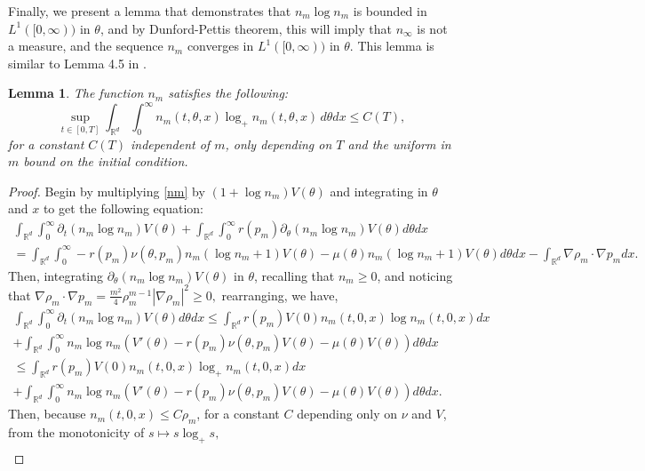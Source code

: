 \documentclass{amsart}
\newtheorem{lemma}[theorem]{Lemma}
\def\R{\mathbb R}
\begin{document}
Finally, we present a lemma that demonstrates that $n_m \log n_m$ is bounded in $L^1([0,\infty))$ in $\theta$, and by Dunford-Pettis theorem, this will imply that $n_\infty$ is not a measure, and the sequence $n_m$ converges in $L^1([0,\infty))$ in $\theta$. This lemma is similar to Lemma 4.5 in \cite{llmw}.
\begin{lemma}\label{lem.nlogn}
    The function $n_m$ satisfies the following:
    \begin{equation}\label{nlogn}
        \sup_{t \in [0,T]}\int_{\R^d}\int_{0}^{\infty}n_m(t,\theta,x)\log_{+}n_m(t,\theta,x)\,d\theta dx \leq C(T),
    \end{equation}
    for a constant $C(T)$ independent of $m$, only depending on $T$ and the uniform in $m$ bound on the initial condition.
\end{lemma}
\begin{proof}
    Begin by multiplying \eqref{nm} by $(1+\log n_m)V(\theta)$ and integrating in $\theta$ and $x$ to get the following equation:
    \begin{multline*}
    \int_{\R^d}\int_{0}^{\infty}\partial_t (n_m \log n_m)V(\theta)+\int_{\R^d}\int_{0}^{\infty}r(p_m)\partial_\theta(n_m \log n_m)V(\theta)d\theta dx\\=
    \int_{\R^d}\int_{0}^{\infty}-r(p_m)\nu(\theta,p_m)n_m(\log n_m+1)V(\theta)-\mu(\theta)n_m(\log n_m+1)V(\theta)d\theta dx -\int_{\R^d}\nabla \rho_m \cdot \nabla p_m dx.
    \end{multline*}
    Then, integrating $\partial_\theta (n_m \log n_m)V(\theta)$ in $\theta$, recalling that $n_m \geq 0$, and noticing that $\nabla \rho_m \cdot \nabla p_m =\frac{m^2}{4}\rho_m^{m-1}|\nabla \rho_m|^2 \geq 0,$ rearranging, we have,
    \begin{multline*}
        \int_{\R^d}\int_{0}^{\infty}\partial_t (n_m \log n_m)V(\theta)d\theta dx \leq \int_{\R^d}r(p_m)V(0)n_m(t,0,x)\log n_m (t,0,x)dx\\+\int_{\R^d}\int_{0}^{\infty}n_m \log n_m (V'(\theta)-r(p_m)\nu(\theta,p_m)V(\theta)-\mu(\theta)V(\theta))d\theta dx \\
         \leq \int_{\R^d}r(p_m)V(0)n_m(t,0,x)\log_+ n_m (t,0,x)dx\\+\int_{\R^d}\int_{0}^{\infty}n_m \log n_m (V'(\theta)-r(p_m)\nu(\theta,p_m)V(\theta)-\mu(\theta)V(\theta))d\theta dx .
    \end{multline*}
   Then, because $n_m(t,0,x)\leq C\rho_m$, for a constant $C$ depending only on $\nu$ and $V$, from the monotonicity of $s \mapsto s\log_+ s,$
   \begin{align*}

\end{align*}
\end{proof}
\end{document}
